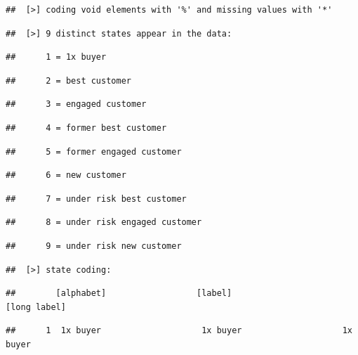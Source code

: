 \documentclass[
]{book}
\begin{document}
\begin{verbatim}
##  [>] coding void elements with '%' and missing values with '*'
\end{verbatim}

\begin{verbatim}
##  [>] 9 distinct states appear in the data:
\end{verbatim}

\begin{verbatim}
##      1 = 1x buyer
\end{verbatim}

\begin{verbatim}
##      2 = best customer
\end{verbatim}

\begin{verbatim}
##      3 = engaged customer
\end{verbatim}

\begin{verbatim}
##      4 = former best customer
\end{verbatim}

\begin{verbatim}
##      5 = former engaged customer
\end{verbatim}

\begin{verbatim}
##      6 = new customer
\end{verbatim}

\begin{verbatim}
##      7 = under risk best customer
\end{verbatim}

\begin{verbatim}
##      8 = under risk engaged customer
\end{verbatim}

\begin{verbatim}
##      9 = under risk new customer
\end{verbatim}

\begin{verbatim}
##  [>] state coding:
\end{verbatim}

\begin{verbatim}
##        [alphabet]                  [label]                     [long label]
\end{verbatim}

\begin{verbatim}
##      1  1x buyer                    1x buyer                    1x buyer
\end{verbatim}
\end{document}
